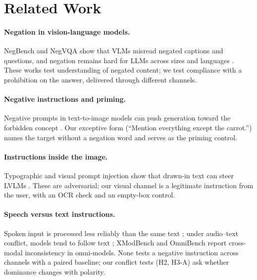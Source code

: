 \section{Related Work}
\label{sec:related}

\paragraph{Negation in vision-language models.}
NegBench \citep{alhamoud2025negbench} and NegVQA \citep{zhang2025negvqa} show that VLMs misread negated captions and
questions, and negation remains hard for LLMs across sizes and languages \citep{vrabcova2025negation}. These works test
understanding of negated content; we test compliance with a prohibition on the answer, delivered through different
channels.

\paragraph{Negative instructions and priming.}
Negative prompts in text-to-image models can push generation toward the forbidden concept
\citep{hwang2024pinkelephant}. Our exceptive form (``Mention everything except the carrot.'') names the target
without a negation word and serves as the priming control.

\paragraph{Instructions inside the image.}
Typographic and visual prompt injection show that drawn-in text can steer LVLMs
\citep{kimura2024goalhijacking,cheng2025typographic,balakrishnan2026pixels}. These are adversarial; our visual
channel is a legitimate instruction from the user, with an OCR check and an empty-box control.

\paragraph{Speech versus text instructions.}
Spoken input is processed less reliably than the same text \citep{hsu2026modalitygap,chen2024voicebench}; under
audio--text conflict, models tend to follow text \citep{wang2025audiotext,billa2026alme}; XModBench
\citep{wang2025xmodbench} and OmniBench \citep{li2024omnibench} report cross-modal inconsistency in omni-models. None
tests a negative instruction across channels with a paired baseline; our conflict tests (H2, H3-A) ask whether
dominance changes with polarity.

